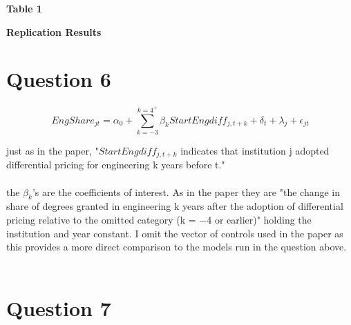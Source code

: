 \documentclass[11pt]{article}
\begin{document}
\begin{center}
	
	\centering
	\LARGE{\textbf{Table 1}}\par\medskip
	
	\normalsize{\textbf{Replication Results }}\par\medskip
	\scalebox{1}{
		
	}
\end{center}


\section{Question 6}

$$
EngShare_{jt} = \alpha_0 + \sum_{k=-3}^{k=4^+} \beta_k StartEngdiff_{j, t+k} +  \delta_t + \lambda_j + \epsilon_{jt}   $$
 
 just as in the paper, "$StartEngdiff_{j, t+k}$ indicates that institution j adopted differential pricing for engineering k years before t." \\ \\ 
 
 the $\beta_k$'s are the coefficients of interest. As in the paper they are "the change in share of degrees granted in engineering k years after the adoption of differential pricing relative to the omitted category (k = −4 or earlier)" holding the institution and year constant. I omit the vector of controls used in the paper as this provides a more direct comparison to the models run in the question above.  \\ \\ 
 

 \section{Question 7}
 
\end{document}
